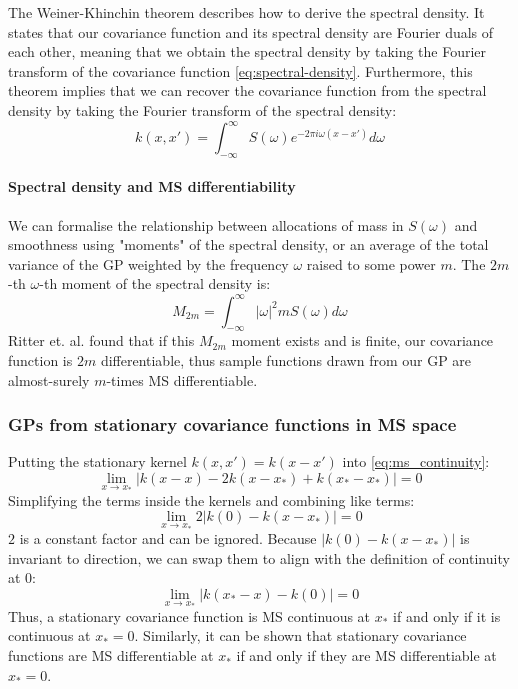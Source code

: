 The Weiner-Khinchin theorem \cite{gp-ml} describes how to derive the spectral density. It states that our covariance function and its spectral density are Fourier duals of each other, meaning that we obtain the spectral density by taking the Fourier transform of the covariance function \ref{eq:spectral-density}. Furthermore, this theorem implies that we can recover the covariance function from the spectral density by taking the Fourier transform of the spectral density:
\begin{equation} \label{eq:weiner-khinchin}
    k(x, x') = \int_{-\infty}^{\infty} S(\omega) e^{-2\pi i \omega (x - x')} d\omega
\end{equation}

\paragraph{Spectral density and MS differentiability}
We can formalise the relationship between allocations of mass in $S(\omega)$ and smoothness using "moments" of the spectral density, or an average of the total variance of the GP weighted by the frequency $\omega$ raised to some power $m$. The $2m$-th $\omega$-th moment of the spectral density is:
\begin{equation*}
    M_{2m} = \int_{-\infty}^{\infty} |\omega|^2m S(\omega) d\omega
\end{equation*}
Ritter et. al. \cite{fourier-moments} found that if this $M_{2m}$ moment exists and is finite, our covariance function is $2m$ differentiable, thus sample functions drawn from our GP are almost-surely $m$-times MS differentiable. 



\subsubsection{GPs from stationary covariance functions in MS space}
Putting the stationary kernel $k(x,x') = k(x - x')$ into \ref{eq:ms_continuity}:
\begin{equation*}
    \lim_{x \to x_*} | k(x - x) - 2k(x - x_*) + k(x_* - x_*) | = 0
\end{equation*}
Simplifying the terms inside the kernels and combining like terms:
\begin{equation*}
    \lim_{x \to x_*} 2 | k(0) - k(x - x_*) | = 0
\end{equation*}
$2$ is a constant factor and can be ignored. Because $ | k(0) - k(x - x_*) |$ is invariant to direction, we can swap them to align with the definition of continuity at 0:
\begin{equation*}
    \lim_{x \to x_*} | k(x_* - x) - k(0) | = 0
\end{equation*}
Thus, a stationary covariance function is MS continuous at $x_*$ if and only if it is continuous at $x_* = 0$. Similarly, it can be shown \cite{gp-ml} that stationary covariance functions are MS differentiable at $x_*$ if and only if they are MS differentiable at $x_* = 0$.


